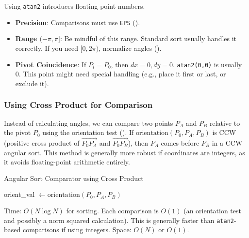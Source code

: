 \begin{warning}
\label{warn:A.4.2.atan2_precision} %
Using \texttt{atan2} introduces floating-point numbers.
\begin{itemize}
    \item \textbf{Precision}: Comparisons must use \texttt{EPS} ().
    \item \textbf{Range $(-\pi, \pi]$}: Be mindful of this range. Standard sort usually handles it correctly. If you need $[0, 2\pi)$, normalize angles ().
    \item \textbf{Pivot Coincidence}: If $P_i = P_0$, then $dx=0, dy=0$. \texttt{atan2(0,0)} is usually 0. This point might need special handling (e.g., place it first or last, or exclude it).
\end{itemize}
\end{warning}

\subsubsection{Using Cross Product for Comparison}
\label{sssec:A.4.2.2.cross_product_sort}

\begin{intuition}
\label{intuition:A.4.2.cross_product_sort}
Instead of calculating angles, we can compare two points $P_A$ and $P_B$ relative to the pivot $P_0$ using the orientation test ().
If $\text{orientation}(P_0, P_A, P_B)$ is CCW (positive cross product of $\vec{P_0P_A}$ and $\vec{P_0P_B}$), then $P_A$ comes before $P_B$ in a CCW angular sort.
This method is generally more robust if coordinates are integers, as it avoids floating-point arithmetic entirely.
\end{intuition}

\begin{algorithm}[H]
\caption{Angular Sort Comparator using Cross Product}
\label{alg:A.4.2.cross_product_sort_cmp}

orient\_val $\leftarrow \text{orientation}(P_0, P_A, P_B)$\;

 
\end{algorithm}
\begin{complexity}
\label{comp:A.4.2.cross_product_sort}
Time: $O(N \log N)$ for sorting. Each comparison is $O(1)$ (an orientation test and possibly a norm squared calculation). This is generally faster than \texttt{atan2}-based comparisons if using integers.
Space: $O(N)$ or $O(1)$.
\end{complexity}

